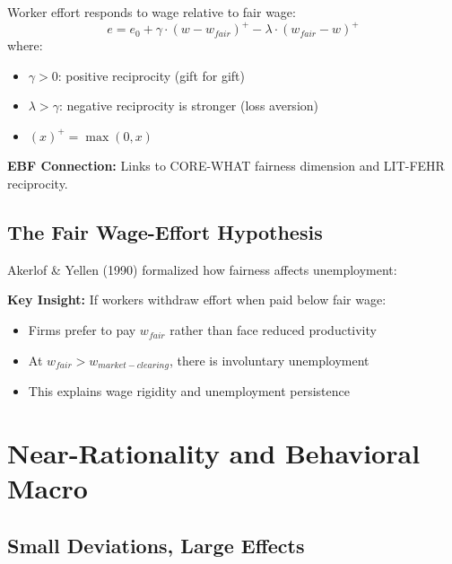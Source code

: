 \begin{axiom}
\label{ax:ga4}
Worker effort responds to wage relative to fair wage:
\begin{equation}
e = e_0 + \gamma \cdot (w - w_{fair})^+ - \lambda \cdot (w_{fair} - w)^+
\end{equation}
where:
\begin{itemize}
    \item $\gamma > 0$: positive reciprocity (gift for gift)
    \item $\lambda > \gamma$: negative reciprocity is stronger (loss aversion)
    \item $(x)^+ = \max(0, x)$
\end{itemize}
\textbf{EBF Connection:} Links to CORE-WHAT fairness dimension and LIT-FEHR reciprocity.
\end{axiom}

\subsection{The Fair Wage-Effort Hypothesis}

Akerlof \& Yellen (1990) formalized how fairness affects unemployment:

\begin{tcolorbox}[colback=green!5!white, colframe=green!75!black]
\textbf{Key Insight:} If workers withdraw effort when paid below fair wage:
\begin{itemize}
    \item Firms prefer to pay $w_{fair}$ rather than face reduced productivity
    \item At $w_{fair} > w_{market-clearing}$, there is involuntary unemployment
    \item This explains wage rigidity and unemployment persistence
\end{itemize}
\end{tcolorbox}

\section{Near-Rationality and Behavioral Macro}

\subsection{Small Deviations, Large Effects}

